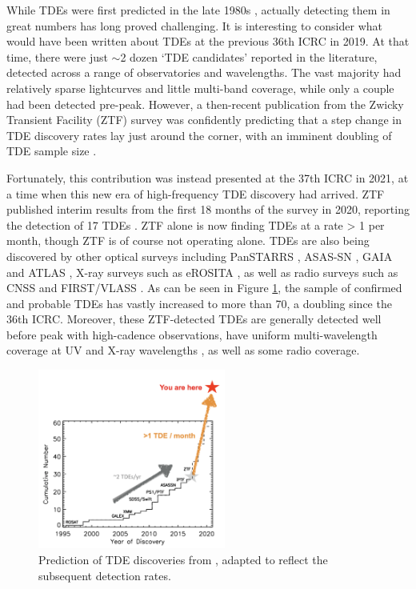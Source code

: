 \documentclass[a4paper,11pt]{article}
\begin{document}
While TDEs were first predicted in the late 1980s \cite{rees_tde_88}, actually detecting them in great numbers has long proved challenging. It is interesting to consider what would have been written about TDEs at the previous 36th ICRC in 2019. At that time, there were just $\sim$2 dozen `TDE candidates' reported in the literature, detected across a range of observatories and wavelengths. The vast majority had relatively sparse lightcurves and little multi-band coverage, while only a couple had been detected pre-peak. However, a then-recent publication from the Zwicky Transient Facility (ZTF) survey was confidently predicting that a step change in TDE discovery rates lay just around the corner, with an imminent doubling of TDE sample size \cite{ztf_19_science}.

Fortunately, this contribution was instead presented at the 37th ICRC in 2021, at a time when this new era of high-frequency TDE discovery had arrived. ZTF published interim results from the first 18 months of the survey in 2020, reporting the detection of 17 TDEs \cite{van_velzen_20}. ZTF alone is now finding TDEs at a rate > 1 per month, though ZTF is of course not operating alone. TDEs are also being discovered by other optical surveys including PanSTARRS \cite{gezari_12}, ASAS-SN \cite{holoien_16}, GAIA \cite{gaia_tde_18} and ATLAS \cite{nicholl_19}, X-ray surveys such as eROSITA \cite{erosita_tde_21}, as well as radio surveys such as CNSS \cite{anderson_20} and FIRST/VLASS \cite{ravi_21}. As can be seen in Figure \ref{fig:tde_disc}, the sample of confirmed and probable TDEs has vastly increased to more than 70, a doubling since the 36th ICRC. Moreover, these ZTF-detected TDEs are generally detected well before peak with high-cadence observations, have uniform multi-wavelength coverage at UV and X-ray wavelengths \cite{van_velzen_20}, as well as some radio coverage. 

\begin{figure}[!ht]
	\centering \includegraphics[width=0.55\textwidth]{figures/ztf_prediction}
	\caption{Prediction of TDE discoveries from \cite{ztf_19_science}, adapted to reflect the subsequent detection rates.}
	\label{fig:tde_disc}
\end{figure}
\end{document}
